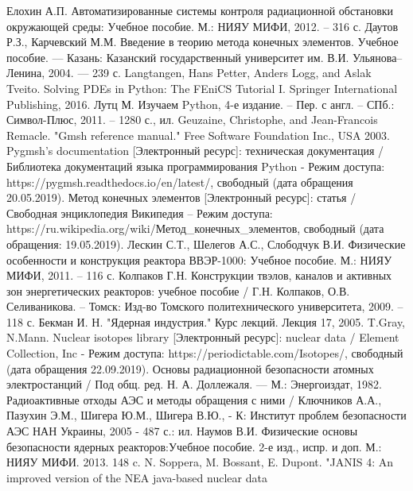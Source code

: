 \begin{thebibliography}{99}
	 Елохин А.П. Автоматизированные системы контроля радиационной обстановки окружающей среды: 
		Учебное пособие. М.: НИЯУ МИФИ, 2012. – 316 с.
	 Даутов Р.З., Карчевский М.М. Введение в теорию метода конечных элементов. Учебное пособие. — Казань: 
		Казанский государственный университет им. В.И. Ульянова–Ленина, 2004. — 239 с.
	 Langtangen, Hans Petter, Anders Logg, and Aslak Tveito. Solving PDEs in Python: The FEniCS 
		Tutorial I. Springer International Publishing, 2016.
	 Лутц М. Изучаем Python, 4-е издание. – Пер. с англ. – СПб.: Символ-Плюс, 2011. – 1280 с., ил.
	 Geuzaine, Christophe, and Jean-Francois Remacle. "Gmsh reference manual." Free Software 
		Foundation Inc., USA 2003.
	 Pygmsh's documentation [Электронный ресурс]: техническая документация / Библиотека документаций 
		языка программирования Python - Режим доступа: https://pygmsh.readthedocs.io/en/latest/, свободный (дата 
		обращения 20.05.2019).
	 Метод конечных элементов [Электронный ресурс]: статья / Свободная энциклопедия Википедия – Режим 
		доступа: https://ru.wikipedia.org/wiki/Метод\_конечных\_элементов, свободный (дата обращения: 19.05.2019).
	 Лескин С.Т., Шелегов А.С., Слободчук В.И. Физические особенности и конструкция реактора 
		ВВЭР-1000: Учебное пособие. М.: НИЯУ МИФИ, 2011. – 116 с.
	 Колпаков Г.Н. Конструкции твэлов, каналов и активных зон энергетических реакторов: учебное 
		пособие / Г.Н. Колпаков, О.В. Селиваникова. – Томск: Изд-во Томского политехнического университета, 2009. 
		– 118 с. 
	 Бекман И. Н. "Ядерная индустрия." Курс лекций. Лекция 17, 2005.
	 T.Gray, N.Mann. Nuclear isotopes library [Электронный ресурс]: nuclear data / Element Collection, 
		Inc - Режим доступа: https://periodictable.com/Isotopes/, свободный (дата обращения 22.09.2019).
	 Основы радиационной безопасности атомных электростанций / Под общ. ред. Н. А. Доллежаля. — 
		М.: Энергоиздат, 1982.
	 Радиоактивные отходы АЭС и методы обращения с ними / Ключников А.А., Пазухин Э.М., Шигера Ю.М., 
		Шигера В.Ю., - К: Институт проблем безопасности АЭС НАН Украины, 2005 - 487 с.: ил.
	 Наумов В.И. Физические основы безопасности ядерных реакторов:Учебное пособие. 2-е изд., испр. 
		и доп. М.: НИЯУ МИФИ. 2013. 148 c.
	 N. Soppera, M. Bossant, E. Dupont. "JANIS 4: An improved version of the NEA java-based nuclear data 

\end{thebibliography}

